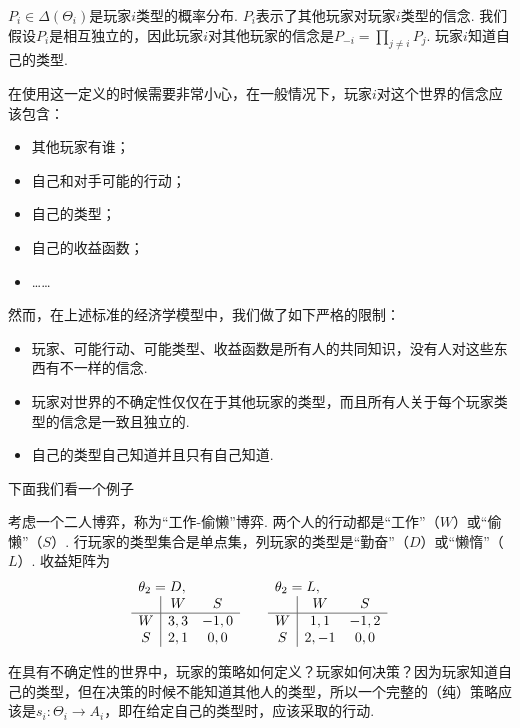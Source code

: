  $P_i\in\Delta(\Theta_i)$是玩家$i$类型的概率分布. $P_i$表示了其他玩家对玩家$i$类型的信念. 我们假设$P_i$是相互独立的，因此玩家$i$对其他玩家的信念是$P_{-i}=\prod_{j\neq i}P_j$. 玩家$i$知道自己的类型.

在使用这一定义的时候需要非常小心，在一般情况下，玩家$i$对这个世界的信念应该包含：
\begin{itemize}
    \item 其他玩家有谁；
    \item 自己和对手可能的行动；
    \item 自己的类型；
    \item 自己的收益函数；
    \item ……
\end{itemize}
然而，在上述标准的经济学模型中，我们做了如下严格的限制：
\begin{itemize}
    \item 玩家、可能行动、可能类型、收益函数是所有人的共同知识，没有人对这些东西有不一样的信念. 
    \item 玩家对世界的不确定性仅仅在于其他玩家的类型，而且所有人关于每个玩家类型的信念是一致且独立的.
    \item 自己的类型自己知道并且只有自己知道.
\end{itemize} 

下面我们看一个例子


\begin{example}[合作者]
考虑一个二人博弈，称为“工作-偷懒”博弈. 两个人的行动都是“工作”（$W$）或“偷懒”（$S$）. 行玩家的类型集合是单点集，列玩家的类型是“勤奋”（$D$）或“懒惰”（$L$）. 收益矩阵为
\[\begin{array}{c|cc}
    \multicolumn{3}{l}{\theta_2=D,}\\
     &W&S  \\\hline
     W&3,3&-1,0\\
     S&2,1&0,0\\
\end{array}\qquad \begin{array}{c|cc}
    \multicolumn{3}{l}{\theta_2=L,}\\
     &W&S  \\\hline
     W&1,1&-1,2\\
     S&2,-1&0,0\\
\end{array}\]
\end{example}

在具有不确定性的世界中，玩家的策略如何定义？玩家如何决策？因为玩家知道自己的类型，但在决策的时候不能知道其他人的类型，所以一个完整的（纯）策略应该是$s_i:\Theta_i\to A_i$，即在给定自己的类型时，应该采取的行动.

